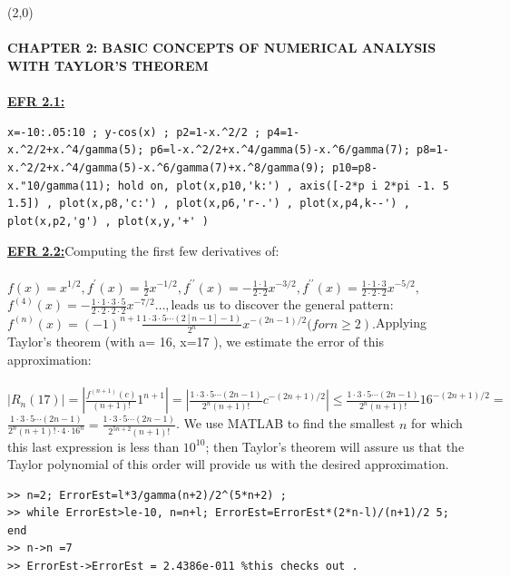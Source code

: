 \documentclass[../main.tex]{subfiles}
\begin{document}
\\
\\ 
\line(2,0){\textwidth}\\
\\
\textbf{CHAPTER 2: BASIC CONCEPTS OF NUMERICAL ANALYSIS WITH 
TAYLOR'S THEOREM }
\\
\\
\textbf{\underline{EFR 2.1:}}
\begin{lstlisting}[numbers=none,frame=none]
 x=-10:.05:10 ; y-cos(x) ; p2=1-x.^2/2 ; p4=1-
x.^2/2+x.^4/gamma(5); p6=l-x.^2/2+x.^4/gamma(5)-x.^6/gamma(7); p8=1-
x.^2/2+x.^4/gamma(5)-x.^6/gamma(7)+x.^8/gamma(9); p10=p8-
x."10/gamma(11); hold on, plot(x,p10,'k:') , axis([-2*p i 2*pi -1. 5 
1.5]) , plot(x,p8,'c:') , plot(x,p6,'r-.') , plot(x,p4,k--') , 
plot(x,p2,'g') , plot(x,y,'+' ) 
\end{lstlisting}
\textbf{\underline{EFR 2.2:}}Computing the first few derivatives of:
\\
\\
$
f(x)=x^{1 / 2}, f^{\prime}(x)=\frac{1}{2} x^{-1 / 2}, f^{\prime \prime}(x)=-\frac{1 \cdot 1}{2 \cdot 2} x^{-3 / 2}, f^{\prime \prime}(x)=\frac{1 \cdot 1 \cdot 3}{2 \cdot 2 \cdot 2} x^{-5 / 2} \text {, }
$
\\
$
f^{(4)}(x)=-\frac{1 \cdot 1 \cdot 3 \cdot 5}{2 \cdot 2 \cdot 2 \cdot 2} x^{-7 / 2} \ldots, $leads us to discover the general pattern:
\\
$
f^{(n)}(x)=(-1)^{n+1} \frac{1 \cdot 3 \cdot 5 \cdots(2[n-1]-1)}{2^{n}} x^{-(2 n-1) / 2} (for \left.n \geq 2\right). $Applying Taylor's theorem (with a= 16, x=17 ), we estimate the error of this approximation:
\\
\\
$
\left|R_{n}(17)\right|=\left|\frac{f^{(n+1)}(c)}{(n+1) !} 1^{n+1}\right|=\left|\frac{1 \cdot 3 \cdot 5 \cdots(2 n-1)}{2^{n}(n+1) !} c^{-(2 n+1) / 2}\right| \leq \frac{1 \cdot 3 \cdot 5 \cdots(2 n-1)}{2^{n}(n+1) !} 16^{-(2 n+1) / 2}=$
\\
$\frac{1 \cdot 3 \cdot 5 \cdots(2 n-1)}{2^{n}(n+1) ! \cdot 4 \cdot 16^{n}}=\frac{1 \cdot 3 \cdot 5 \cdots(2 n-1)}{2^{5 n+2}(n+1) !}$. We use MATLAB to find the smallest $n$ for which this last expression is less than $10^{10}$; then Taylor's theorem will assure us that the Taylor polynomial of this 
order will provide us with the desired approximation.
\begin{lstlisting}[numbers=none,frame=none]
>> n=2; ErrorEst=l*3/gamma(n+2)/2^(5*n+2) ; 
>> while ErrorEst>le-10, n=n+l; ErrorEst=ErrorEst*(2*n-l)/(n+1)/2 5; 
end 
>> n->n =7 
>> ErrorEst->ErrorEst = 2.4386e-011 %this checks out . 
\end{lstlisting} 
\end{document}
